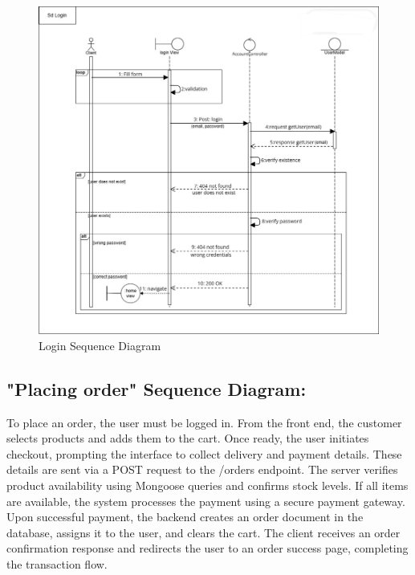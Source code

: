 \newpage
\begin{figure}[!h]
\begin{center}
\includegraphics{images/Login Sequence Diagram.png}
\end{center}
\caption{Login Sequence Diagram}
\end{figure}

\subsection{"Placing order" Sequence Diagram:} 

To place an order, the user must be logged in. From the front end, the customer selects products and adds them to the cart. Once ready, the user initiates checkout, prompting the interface to collect delivery and payment details. These details are sent via a POST request to the /orders endpoint. The server verifies product availability using Mongoose queries and confirms stock levels. If all items are available, the system processes the payment using a secure payment gateway. Upon successful payment, the backend creates an order document in the database, assigns it to the user, and clears the cart. The client receives an order confirmation response and redirects the user to an order success page, completing the transaction flow.

